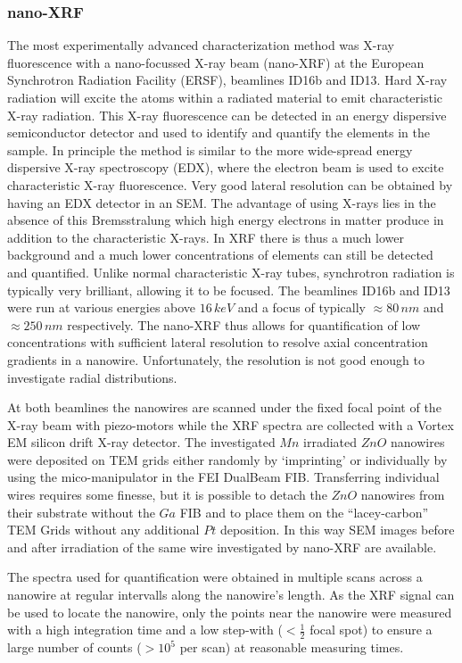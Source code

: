 \subsubsection{nano-XRF}

The most experimentally advanced characterization method was X-ray fluorescence with a nano-focussed X-ray beam (nano-XRF) at the European Synchrotron Radiation Facility (ERSF), beamlines ID16b and ID13. Hard X-ray radiation will excite the atoms within a radiated material to emit characteristic X-ray radiation. This X-ray fluorescence can be detected in an energy dispersive semiconductor detector and used to identify and quantify the elements in the sample. In principle the method is similar to the more wide-spread energy dispersive X-ray spectroscopy (EDX), where the electron beam is used to excite characteristic X-ray fluorescence. Very good lateral resolution can be obtained by having an EDX detector in an SEM. The advantage of using X-rays lies in the absence of this Bremsstralung which high energy electrons in matter produce in addition to the characteristic X-rays. In XRF there is thus a much lower background and a much lower concentrations of elements can still be detected and quantified. Unlike normal characteristic X-ray tubes, synchrotron radiation is typically very brilliant, allowing it to be focused. The beamlines ID16b and ID13 were run at various energies above $16\,keV$ and a focus of typically $\approx 80\,nm$ and $\approx 250\,nm$ respectively. The nano-XRF thus allows for quantification of low concentrations with sufficient lateral resolution to resolve axial concentration gradients in a nanowire. Unfortunately, the resolution is not good enough to investigate radial distributions.

At both beamlines the nanowires are scanned under the fixed focal point of the X-ray beam with piezo-motors while the XRF spectra are collected with a Vortex EM silicon drift X-ray detector. The investigated $Mn$ irradiated $ZnO$ nanowires were deposited on TEM grids either randomly by `imprinting' or individually by using the mico-manipulator in the FEI DualBeam FIB. Transferring individual wires requires some finesse, but it is possible to detach the $ZnO$ nanowires from their substrate without the $Ga$ FIB and to place them on the ``lacey-carbon'' TEM Grids without any additional $Pt$ deposition. In this way SEM images before and after irradiation of the same wire investigated by nano-XRF are available.

The spectra used for quantification were obtained in multiple scans across a nanowire at regular intervalls along the nanowire's length. As the XRF signal can be used to locate the nanowire, only the points near the nanowire were measured with a high integration time and a low step-with ($< \frac{1}{2}$ focal spot) to ensure a large number of counts ($> 10^5$ per scan) at reasonable measuring times.

